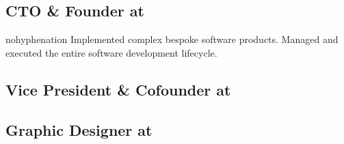{\subsection{\textbf{CTO \& Founder} at  \shyears{[1997-2008]}}
\begin{sloppypar}\begin{hyphenrules}{nohyphenation}
\small{Implemented complex bespoke software products.  Managed and executed the entire software development lifecycle.}
\end{hyphenrules}\end{sloppypar}
\medskip

\subsection{\textbf{Vice President \& Cofounder} at  \shyears{[1995-1999]}}
\smallskip

\subsection{\textbf{Graphic Designer} at   \shyears{[1993-1995]}}


}
